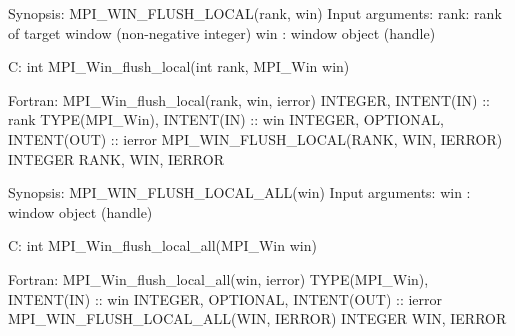 Synopsis:
MPI_WIN_FLUSH_LOCAL(rank, win)
Input arguments:
rank: rank of target window (non-negative integer)
win : window object (handle)

C:
int MPI_Win_flush_local(int rank, MPI_Win win)

Fortran:
MPI_Win_flush_local(rank, win, ierror)
INTEGER, INTENT(IN) :: rank
TYPE(MPI_Win), INTENT(IN) :: win
INTEGER, OPTIONAL, INTENT(OUT) :: ierror
MPI_WIN_FLUSH_LOCAL(RANK, WIN, IERROR)
INTEGER RANK, WIN, IERROR

Synopsis:
MPI_WIN_FLUSH_LOCAL_ALL(win)
Input arguments:
win : window object (handle)

C:
int MPI_Win_flush_local_all(MPI_Win win)

Fortran:
MPI_Win_flush_local_all(win, ierror)
TYPE(MPI_Win), INTENT(IN) :: win
INTEGER, OPTIONAL, INTENT(OUT) :: ierror
MPI_WIN_FLUSH_LOCAL_ALL(WIN, IERROR)
INTEGER WIN, IERROR
